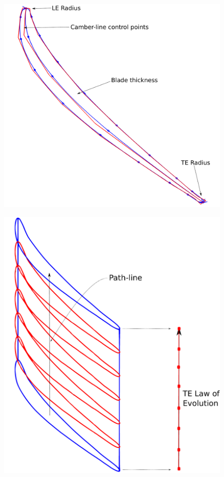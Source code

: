 \documentclass[9pt,academicons]{article}
\begin{document}
\begin{figure}
\centering
\begin{minipage}{.5\textwidth}
  \centering
  \includegraphics[scale=0.2]{img/sectionCosPic.pdf}
   \label{fig:2dsection}
 \end{minipage}%
\begin{minipage}{.5\textwidth}
  \centering
 \includegraphics[scale=0.23]{img/blade2.pdf}
  \label{fig:Blade}
\end{minipage}
\end{figure}
\end{document}
